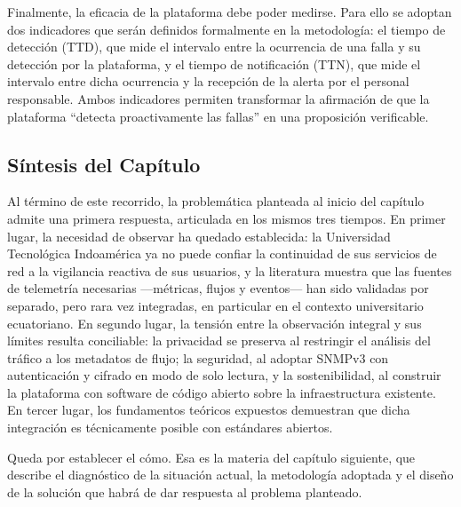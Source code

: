 Finalmente, la eficacia de la plataforma debe poder medirse. Para ello se adoptan dos indicadores que serán definidos formalmente en la metodología: el tiempo de detección (TTD), que mide el intervalo entre la ocurrencia de una falla y su detección por la plataforma, y el tiempo de notificación (TTN), que mide el intervalo entre dicha ocurrencia y la recepción de la alerta por el personal responsable. Ambos indicadores permiten transformar la afirmación de que la plataforma ``detecta proactivamente las fallas'' en una proposición verificable.

\subsection{Síntesis del Capítulo}

Al término de este recorrido, la problemática planteada al inicio del capítulo admite una primera respuesta, articulada en los mismos tres tiempos. En primer lugar, la necesidad de observar ha quedado establecida: la Universidad Tecnológica Indoamérica ya no puede confiar la continuidad de sus servicios de red a la vigilancia reactiva de sus usuarios, y la literatura muestra que las fuentes de telemetría necesarias ---métricas, flujos y eventos--- han sido validadas por separado, pero rara vez integradas, en particular en el contexto universitario ecuatoriano. En segundo lugar, la tensión entre la observación integral y sus límites resulta conciliable: la privacidad se preserva al restringir el análisis del tráfico a los metadatos de flujo; la seguridad, al adoptar SNMPv3 con autenticación y cifrado en modo de solo lectura, y la sostenibilidad, al construir la plataforma con software de código abierto sobre la infraestructura existente. En tercer lugar, los fundamentos teóricos expuestos demuestran que dicha integración es técnicamente posible con estándares abiertos.

Queda por establecer el cómo. Esa es la materia del capítulo siguiente, que describe el diagnóstico de la situación actual, la metodología adoptada y el diseño de la solución que habrá de dar respuesta al problema planteado.

